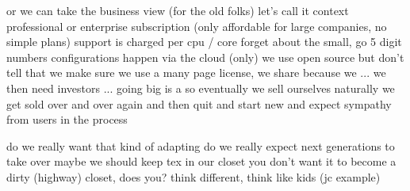 \startsection[title={think of this 2}]
    \startitemize
    \startitem or we can take the business view (for the old folks) \stopitem
    \startitem let's call it context professional or enterprise \stopitem
    \startitem subscription (only affordable for large companies, no simple plans) \stopitem
    \startitem support is charged per cpu / core \stopitem
    \startitem forget about the small, go 5 digit numbers \stopitem
    \startitem configurations happen via the cloud (only) \stopitem
    \startitem we use open source but don't tell that \stopitem
    \startitem we make sure we use a many page license, we share because we ... \stopitem
    \startitem we then need investors ... going big is a  \stopitem
    \startitem so eventually we sell ourselves \stopitem
    \startitem naturally we get sold over and over again \stopitem
    \startitem and then quit and start new \stopitem
    \startitem and expect sympathy from users in the process \stopitem
    \stopitemize
\stopsection

\startsection[title={so \unknown\ grandpa}]
    \startitemize
    \startitem do we really want that kind of adapting \stopitem
    \startitem do we really expect next generations to take over \stopitem
    \startitem maybe we should keep tex in our closet \stopitem
    \startitem you don't want it to become a dirty (highway) closet, does you? \stopitem
    \startitem think different, think like kids (jc example) \stopitem
    \stopitemize
\stopsection

\stopdocument
